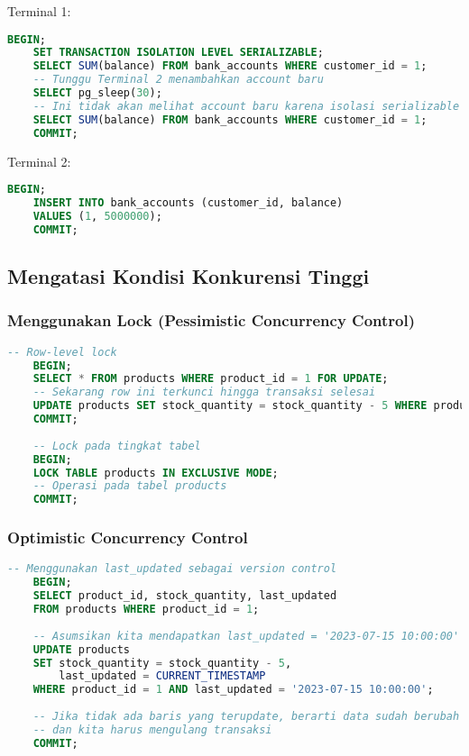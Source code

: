 Terminal 1:
\begin{lstlisting}[language=SQL]
	BEGIN;
	SET TRANSACTION ISOLATION LEVEL SERIALIZABLE;
	SELECT SUM(balance) FROM bank_accounts WHERE customer_id = 1;
	-- Tunggu Terminal 2 menambahkan account baru
	SELECT pg_sleep(30);
	-- Ini tidak akan melihat account baru karena isolasi serializable
	SELECT SUM(balance) FROM bank_accounts WHERE customer_id = 1;
	COMMIT;
\end{lstlisting}

Terminal 2:
\begin{lstlisting}[language=SQL]
	BEGIN;
	INSERT INTO bank_accounts (customer_id, balance)
	VALUES (1, 5000000);
	COMMIT;
\end{lstlisting}

\subsection{Mengatasi Kondisi Konkurensi Tinggi}

\subsubsection{Menggunakan Lock (Pessimistic Concurrency Control)}
\begin{lstlisting}[language=SQL]
	-- Row-level lock
	BEGIN;
	SELECT * FROM products WHERE product_id = 1 FOR UPDATE;
	-- Sekarang row ini terkunci hingga transaksi selesai
	UPDATE products SET stock_quantity = stock_quantity - 5 WHERE product_id = 1;
	COMMIT;
	
	-- Lock pada tingkat tabel
	BEGIN;
	LOCK TABLE products IN EXCLUSIVE MODE;
	-- Operasi pada tabel products
	COMMIT;
\end{lstlisting}

\subsubsection{Optimistic Concurrency Control}
\begin{lstlisting}[language=SQL]
	-- Menggunakan last_updated sebagai version control
	BEGIN;
	SELECT product_id, stock_quantity, last_updated
	FROM products WHERE product_id = 1;
	
	-- Asumsikan kita mendapatkan last_updated = '2023-07-15 10:00:00'
	UPDATE products
	SET stock_quantity = stock_quantity - 5,
	    last_updated = CURRENT_TIMESTAMP
	WHERE product_id = 1 AND last_updated = '2023-07-15 10:00:00';
	
	-- Jika tidak ada baris yang terupdate, berarti data sudah berubah
	-- dan kita harus mengulang transaksi
	COMMIT;
\end{lstlisting}


